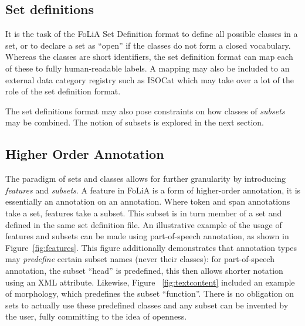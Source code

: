 \documentclass[a4paper,10pt,twoside]{article}
\begin{document}



\subsection{Set definitions}
\label{sec:setdefinitions}

It is the task of the FoLiA Set Definition format to define all possible
classes in a set, or to declare a set as ``open'' if the classes do not form a
closed vocabulary. Whereas the classes are short identifiers, the set
definition format can map each of these to fully human-readable labels. A
mapping may also be included to an external data category registry such as
ISOCat \cite{ISOCAT} which may take over a lot of the role of the set
definition format.

The set definitions format may also pose constraints on how classes of
\emph{subsets} may be combined. The notion of subsets is explored in the next
section.

\subsection{Higher Order Annotation}
\label{sec:higherorder}
\label{sec:features}

The paradigm of sets and classes allows for further granularity by introducing
\emph{features} and \emph{subsets}. A feature in FoLiA is a form of
higher-order annotation, it is essentially an annotation on an annotation.
Where token and span annotations take a set, features take a subset. This
subset is in turn member of a set and defined in the same set definition file.
An illustrative example of the usage of features and subsets can be made using
part-of-speech annotation, as shown in Figure~\ref{fig:features}. This figure
additionally demonstrates that annotation types may \emph{predefine} certain subset
names (never their classes): for part-of-speech annotation, the subset ``head''
is predefined, this then allows shorter notation using an XML attribute.  Likewise,
Figure~ \ref{fig:textcontent} included an example of morphology, which predefines
the subset ``function''. There is no obligation on sets to actually use these
predefined classes and any subset can be invented by the user, fully committing
to the idea of openness. %
\end{document}
